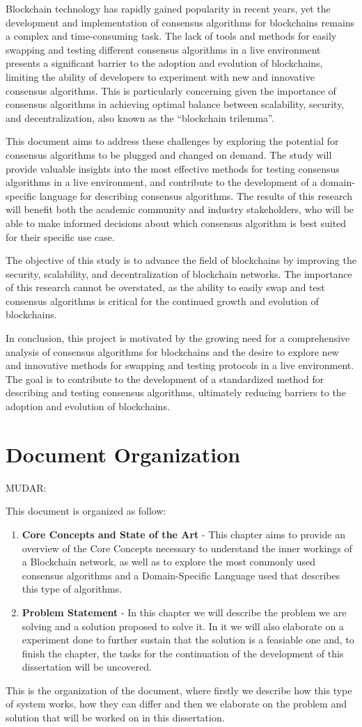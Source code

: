 Blockchain technology has rapidly gained popularity in recent years, yet the development and implementation of consensus algorithms for blockchains remains a complex and time-consuming task. The lack of tools and methods for easily swapping and testing different consensus algorithms in a live environment presents a significant barrier to the adoption and evolution of blockchains, limiting the ability of developers to experiment with new and innovative consensus algorithms. This is particularly concerning given the importance of consensus algorithms in achieving optimal balance between scalability, security, and decentralization, also known as the ``blockchain trilemma''.

This document aims to address these challenges by exploring the potential for consensus algorithms to be plugged and changed on demand. The study will provide valuable insights into the most effective methods for testing consensus algorithms in a live environment, and contribute to the development of a domain-specific language for describing consensus algorithms. The results of this research will benefit both the academic community and industry stakeholders, who will be able to make informed decisions about which consensus algorithm is best suited for their specific use case.

The objective of this study is to advance the field of blockchains by improving the security, scalability, and decentralization of blockchain networks. The importance of this research cannot be overstated, as the ability to easily swap and test consensus algorithms is critical for the continued growth and evolution of blockchains.

In conclusion, this project is motivated by the growing need for a comprehensive analysis of consensus algorithms for blockchains and the desire to explore new and innovative methods for swapping and testing protocols in a live environment. The goal is to contribute to the development of a standardized method for describing and testing consensus algorithms, ultimately reducing barriers to the adoption and evolution of blockchains.

\section{Document Organization}
MUDAR:

This document is organized as follow:
\begin{enumerate}
    \item \textbf{Core Concepts and State of the Art} - This chapter aims to provide an overview of the Core Concepts necessary to understand the inner workings of a Blockchain network, as well as to explore the most commonly used consensus algorithms and a Domain-Specific Language used that describes this type of algorithms.
    \item \textbf{Problem Statement} - In this chapter we will describe the problem we are solving and a solution proposed to solve it. In it we will also elaborate on a experiment done to further sustain that the solution is a feasiable one and, to finish the chapter, the tasks for the continuation of the development of this dissertation will be uncovered.
\end{enumerate}

This is the organization of the document, where firstly we describe how this type of system works, how they can differ and then we elaborate on the problem and solution that will be worked on in this dissertation.
